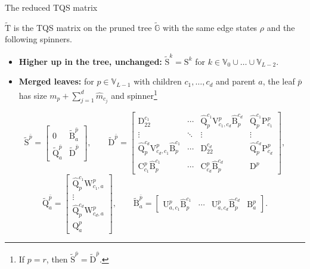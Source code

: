 \documentclass[aspectratio=169,11pt]{beamer}
\begin{document}
\begin{frame}{The reduced TQS matrix}
\footnotesize
\begin{definition}
\upshape
$\tilde{\mathrm{T}}$ is the TQS matrix on the pruned tree $\tilde{\mathbb{G}}$ with the same edge states
$\rho$ and the following spinners.
\begin{itemize}
\setlength{\itemsep}{2mm}
\item \textbf{Higher up in the tree, unchanged:}\quad
  $\tilde{\mathrm{S}}^k=\mathrm{S}^k$ for $k\in\mathbb{V}_0\cup\dots\cup\mathbb{V}_{L-2}$.
\item \textbf{Merged leaves:} for $p\in\mathbb{V}_{L-1}$ with children $c_1,\dots,c_d$ and parent $a$,
  the leaf $\bar{p}$ has size $m_p+\sum_{j=1}^{d}\hat{m}_{c_j}$ and spinner\footnote{If $p=r$, then $\tilde{\mathrm{S}}^{\bar{p}}=\tilde{\mathrm{D}}^{\bar{p}}$.}
\end{itemize}
\[
\tilde{\mathrm{S}}^{\bar{p}}=\begin{bmatrix}0 & \tilde{\mathrm{B}}^{\bar{p}}_a\\ \tilde{\mathrm{Q}}^{\bar{p}}_a & \tilde{\mathrm{D}}^{\bar{p}}\end{bmatrix},\qquad
\tilde{\mathrm{D}}^{\bar{p}}=\begin{bmatrix}
\mathrm{D}^{c_1}_{22} & \cdots & \hat{\mathrm{Q}}^{c_1}_p\mathrm{V}^p_{c_1,c_d}\hat{\mathrm{B}}^{c_d}_p & \hat{\mathrm{Q}}^{c_1}_p\mathrm{P}^p_{c_1}\\
\vdots & \ddots & \vdots & \vdots\\
\hat{\mathrm{Q}}^{c_d}_p\mathrm{V}^p_{c_d,c_1}\hat{\mathrm{B}}^{c_1}_p & \cdots & \mathrm{D}^{c_d}_{22} & \hat{\mathrm{Q}}^{c_d}_p\mathrm{P}^p_{c_d}\\
\mathrm{C}^p_{c_1}\hat{\mathrm{B}}^{c_1}_p & \cdots & \mathrm{C}^p_{c_d}\hat{\mathrm{B}}^{c_d}_p & \mathrm{D}^p
\end{bmatrix},
\]
\[
\tilde{\mathrm{Q}}^{\bar{p}}_a=\begin{bmatrix}\hat{\mathrm{Q}}^{c_1}_p\mathrm{W}^p_{c_1,a}\\ \vdots\\ \hat{\mathrm{Q}}^{c_d}_p\mathrm{W}^p_{c_d,a}\\ \mathrm{Q}^p_a\end{bmatrix},\qquad
\tilde{\mathrm{B}}^{\bar{p}}_a=\begin{bmatrix}\mathrm{U}^p_{a,c_1}\hat{\mathrm{B}}^{c_1}_p & \cdots & \mathrm{U}^p_{a,c_d}\hat{\mathrm{B}}^{c_d}_p & \mathrm{B}^p_a\end{bmatrix}.
\]
\end{definition}
\end{frame}
\end{document}
